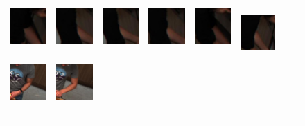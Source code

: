 \documentclass[runningheads]{llncs}
\begin{document}
\begin{figure}[t]
\begin{center}
\begin{tabular}{@{}c@{}c@{}c@{}c@{}c@{}c@{}c@{}c@{}}
\includegraphics[height=0.1375\linewidth]{figures/biposelets/poselet-289/sample-2-f0.jpg}\,&
\includegraphics[height=0.1375\linewidth]{figures/biposelets/poselet-289/sample-3-f0.jpg}\,&
\includegraphics[height=0.1375\linewidth]{figures/biposelets/poselet-289/sample-4-f0.jpg}\,&
\includegraphics[height=0.1375\linewidth]{figures/biposelets/poselet-289/sample-5-f0.jpg}\,&
\includegraphics[height=0.1375\linewidth]{figures/biposelets/poselet-289/sample-6-f0.jpg}\,&
\includegraphics[height=0.1375\linewidth]{figures/biposelets/poselet-289/sample-7-f0.jpg}\\
%
\includegraphics[height=0.1375\linewidth]{figures/biposelets/poselet-297/sample-1-f0.jpg}\,&
\includegraphics[height=0.1375\linewidth]{figures/biposelets/poselet-297/sample-2-f0.jpg}\,&

\end{tabular}
\end{center}
\end{figure}
\end{document}
